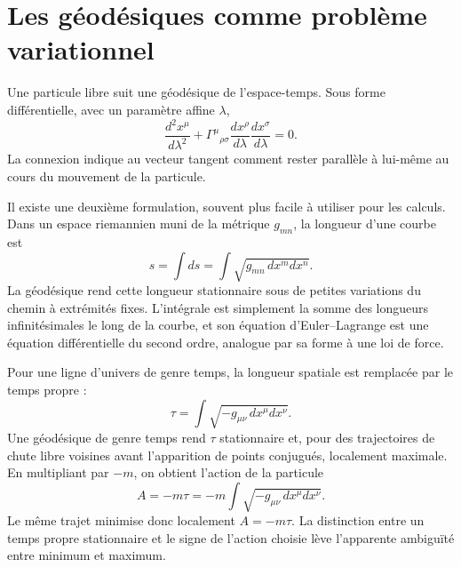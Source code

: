 \begin{classroomqa}
\end{classroomqa}

\section{Les géodésiques comme problème variationnel}

Une particule libre suit une géodésique de l’espace-temps. Sous forme différentielle, avec un paramètre affine \(\lambda\),
\begin{equation}
\frac{d^2x^\mu}{d\lambda^2}
+\Gamma^\mu{}_{\rho\sigma}
\frac{dx^\rho}{d\lambda}
\frac{dx^\sigma}{d\lambda}=0.
\label{eq:l5-geodesic}
\end{equation}
La connexion indique au vecteur tangent comment rester parallèle à lui-même au cours du mouvement de la particule.

Il existe une deuxième formulation, souvent plus facile à utiliser pour les calculs. Dans un espace riemannien muni de la métrique \(g_{mn}\), la longueur d’une courbe est
\begin{equation}
s=\int ds
=\int\sqrt{g_{mn}\,dx^m dx^n}.
\label{eq:l5-spatial-length}
\end{equation}
La géodésique rend cette longueur stationnaire sous de petites variations du chemin à extrémités fixes. L’intégrale est simplement la somme des longueurs infinitésimales le long de la courbe, et son équation d’Euler--Lagrange est une équation différentielle du second ordre, analogue par sa forme à une loi de force.

Pour une ligne d’univers de genre temps, la longueur spatiale est remplacée par le temps propre :
\begin{equation}
\tau
=\int\sqrt{-g_{\mu\nu}\,dx^\mu dx^\nu}.
\label{eq:l5-proper-time-functional}
\end{equation}
Une géodésique de genre temps rend \(\tau\) stationnaire et, pour des trajectoires de chute libre voisines avant l’apparition de points conjugués, localement maximale. En multipliant par \(-m\), on obtient l’action de la particule
\begin{equation}
A=-m\tau
=-m\int\sqrt{-g_{\mu\nu}\,dx^\mu dx^\nu}.
\label{eq:l5-particle-action}
\end{equation}
Le même trajet minimise donc localement \(A=-m\tau\). La distinction entre un temps propre stationnaire et le signe de l’action choisie lève l’apparente ambiguïté entre minimum et maximum.

